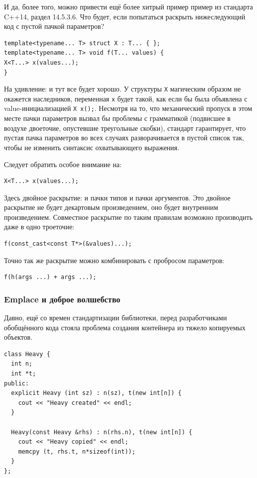 \documentclass[a4paper,12pt,oneside]{article}
\begin{document}
И да, более того, можно привести ещё более хитрый пример пример из стандарта C++14, раздел 14.5.3.6. Что будет, если попытаться раскрыть нижеследующий код с пустой пачкой параметров?

\begin{lstlisting}
template<typename... T> struct X : T... { };
template<typename... T> void f(T... values) {
X<T...> x(values...);
}
\end{lstlisting}

На удивление: и тут все будет хорошо. У структуры \lstinline!X! магическим образом не окажется наследников, переменная \lstinline!x! будет такой, как если бы была объявлена с value-инициализацией \lstinline!X x();!. Несмотря на то, что механический пропуск в этом месте пачки параметров вызвал бы проблемы с грамматикой (подвисшее в воздухе двоеточие, опустевшие треугольные скобки), стандарт гарантирует, что пустая пачка параметров во всех случаях разворачивается в пустой список так, чтобы не изменить синтаксис охватывающего выражения.

Следует обратить особое внимание на:

\begin{lstlisting}
X<T...> x(values...);
\end{lstlisting}

Здесь двойное раскрытие: и пачки типов и пачки аргументов. Это двойное раскрытие не будет декартовым произведением, оно будет внутренним произведением. Совместное раскрытие по таким правилам возможно производить даже в одно троеточие:

\begin{lstlisting}
f(const_cast<const T*>(&values)...); 
\end{lstlisting}

Точно так же раскрытие можно комбинировать с пробросом параметров:

\begin{lstlisting}
f(h(args ...) + args ...);
\end{lstlisting}

\subsubsection{Emplace и доброе волшебство}

Давно, ещё со времен стандартизации библиотеки, перед разработчиками обобщённого кода стояла проблема создания контейнера из тяжело копируемых объектов.

\begin{lstlisting}
class Heavy {
  int n;
  int *t;
public:
  explicit Heavy (int sz) : n(sz), t(new int[n]) {
    cout << "Heavy created" << endl;
  }

  Heavy(const Heavy &rhs) : n(rhs.n), t(new int[n]) {
    cout << "Heavy copied" << endl;
    memcpy (t, rhs.t, n*sizeof(int));
  }
};
\end{lstlisting}
\end{document}
